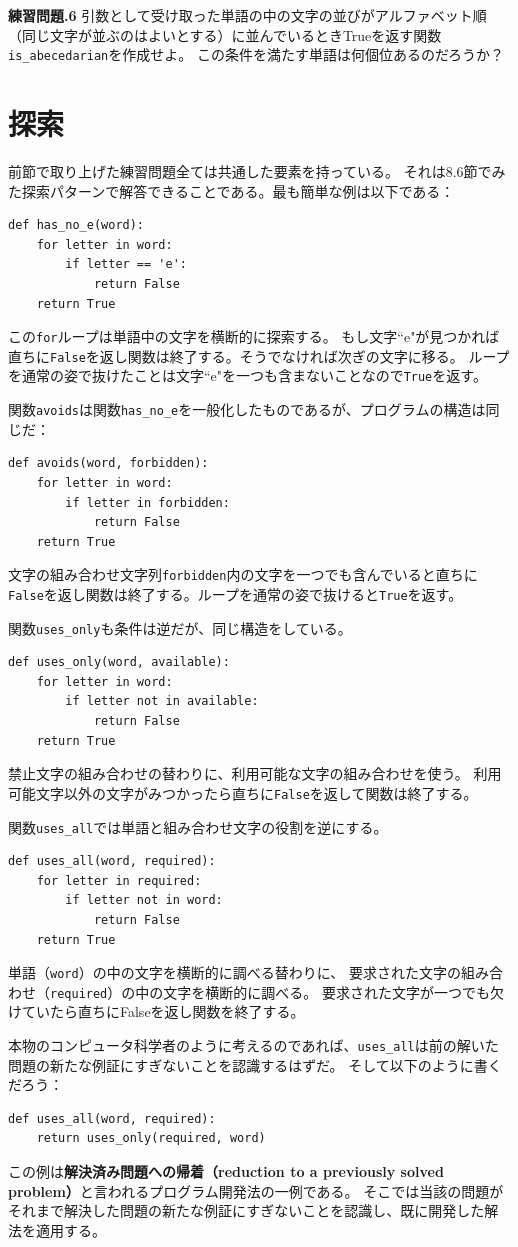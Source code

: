 \documentclass[a4j,12pt,makeidx]{jbook}
\newcommand{\tp}{\thechapter}
\begin{document}
\noindent
{\bf 練習問題\tp.6} 引数として受け取った単語の中の文字の並びがアルファベット順
（同じ文字が並ぶのはよいとする）に並んでいるときTrueを返す関数{\tt is\_abecedarian}を作成せよ。
この条件を満たす単語は何個位あるのだろうか？
%
\section{探索}
前節で取り上げた練習問題全ては共通した要素を持っている。
それは8.6節でみた探索パターンで解答できることである。最も簡単な例は以下である：
\begin{verbatim}
def has_no_e(word):
    for letter in word:
        if letter == 'e':
            return False
    return True
\end{verbatim}
この{\tt for}ループは単語中の文字を横断的に探索する。
もし文字``e"が見つかれば直ちに{\tt False}を返し関数は終了する。そうでなければ次ぎの文字に移る。
ループを通常の姿で抜けたことは文字``e"を一つも含まないことなので{\tt True}を返す。 \par
関数{\tt avoids}は関数{\tt has\_no\_e}を一般化したものであるが、プログラムの構造は同じだ：
\begin{verbatim}
def avoids(word, forbidden):
    for letter in word:
        if letter in forbidden:
            return False
    return True
\end{verbatim}
文字の組み合わせ文字列{\tt forbidden}内の文字を一つでも含んでいると直ちに
{\tt False}を返し関数は終了する。ループを通常の姿で抜けると{\tt True}を返す。 \par
関数{\tt uses\_only}も条件は逆だが、同じ構造をしている。
\begin{verbatim}
def uses_only(word, available):
    for letter in word:
        if letter not in available:
            return False
    return True
\end{verbatim}
禁止文字の組み合わせの替わりに、利用可能な文字の組み合わせを使う。
利用可能文字以外の文字がみつかったら直ちに{\tt False}を返して関数は終了する。\par
関数{\tt uses\_all}では単語と組み合わせ文字の役割を逆にする。
\begin{verbatim}
def uses_all(word, required):
    for letter in required:
        if letter not in word:
            return False
    return True
\end{verbatim}
単語（{\tt word}）の中の文字を横断的に調べる替わりに、
要求された文字の組み合わせ（{\tt required}）の中の文字を横断的に調べる。
要求された文字が一つでも欠けていたら直ちにFalseを返し関数を終了する。\par
本物のコンピュータ科学者のように考えるのであれば、{\tt uses\_all}は前の解いた問題の新たな例証にすぎないことを認識するはずだ。
そして以下のように書くだろう：
\begin{verbatim}
def uses_all(word, required):
    return uses_only(required, word)
\end{verbatim} \par
この例は{\bf 解決済み問題への帰着（reduction to a previously solved problem）}と言われるプログラム開発法の一例である。
そこでは当該の問題がそれまで解決した問題の新たな例証にすぎないことを認識し、既に開発した解法を適用する。
%
\end{document}
